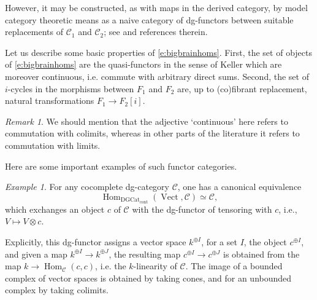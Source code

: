 \documentclass[10pt]{amsart}
\newcommand{\udHom}{\on{Hom}_{\DGCat}}
\newcommand{\on}{\operatorname}
\newcommand{\Vect}{\on{Vect}}
\theoremstyle{remark}
\newtheorem{re}[subsubsection]{Remark}
\newtheorem{ex}[subsubsection]{Example}
\numberwithin{equation}{section}
\newcommand{\sC}{\mathscr{C}}
\newcommand{\msf}{\operatorname}
\newcommand{\DGCat}{\msf{DGCat}_{\on{cont}}}
\begin{document}
 However, it may be 
constructed, as with 
maps in the derived category, by model category theoretic means as a naive 
category of dg-functors between suitable replacements of $\sC_1$ and $\sC_2$; see \cite{toenlectures} and references therein.  

Let us describe some basic properties of \eqref{e:bigbrainhoms}. First, the set of objects 
of \eqref{e:bigbrainhoms} are the quasi-functors in the sense of Keller \cite{kellerderiving} which are moreover continuous, i.e. commute with 
arbitrary direct sums. Second, the set of $i$-cycles in the morphisms between $F_1$ 
and $F_2$ are, up to (co)fibrant replacement, natural transformations $F_1 
\rightarrow F_2[i]$. 

\begin{re} We should mention that the adjective `continuous' here refers to commutation with colimits, whereas in other parts of the literature it refers to commutation with limits. \end{re}


Here are some important examples of such functor categories. 


\begin{ex} For any cocomplete dg-category $\sC$, one has a canonical 
equivalence 
	\[
	     \udHom(\Vect, \sC) \simeq \sC,
	\]
	which exchanges an object $c$ of $\sC$ with the dg-functor of tensoring 
	with $c$, i.e., $V \mapsto V \otimes c$. 
	
	Explicitly, this dg-functor assigns a vector space $k^{\oplus I}$, for a set $I$, the object $c^{\oplus I}$, and given a map $k^{\oplus I} \rightarrow k^{\oplus J}$, the resulting map $c^{\oplus I} \rightarrow c^{\oplus J}$ is obtained from the map $k \rightarrow \on{Hom}_\sC(c, c)$, i.e. the $k$-linearity of $\sC$. The image of a bounded complex of vector spaces is obtained by taking cones, and for an unbounded complex by taking colimits. 
\end{ex}
\end{document}
